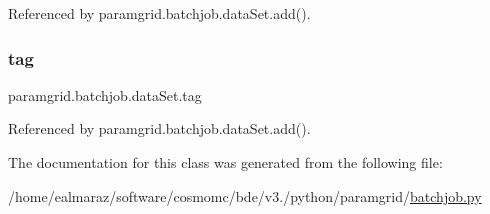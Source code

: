 Referenced by paramgrid.\+batchjob.\+data\+Set.\+add().

\mbox{\label{classparamgrid_1_1batchjob_1_1dataSet_acc70d1eb881555de9dba4159593e2d26}} 
\subsubsection{\texorpdfstring{tag}{tag}}
{\footnotesize\ttfamily paramgrid.\+batchjob.\+data\+Set.\+tag}



Referenced by paramgrid.\+batchjob.\+data\+Set.\+add().



The documentation for this class was generated from the following file\+:\begin{DoxyCompactItemize}
\item 
/home/ealmaraz/software/cosmomc/bde/v3./python/paramgrid/\mbox{\hyperlink{batchjob_8py}{batchjob.\+py}}\end{DoxyCompactItemize}
